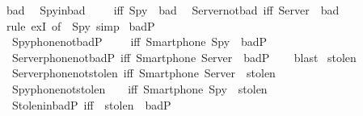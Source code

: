 \begin{isabellebody}
  \isanewline
  \isamarkupfalse%
  \ {\isacharparenleft}bad{\isacharparenright}\isanewline
  \ \ Spy{\isacharunderscore}in{\isacharunderscore}bad\ \ \ \ \ {\isacharbrackleft}iff{\isacharbrackright}{\isacharcolon}\ {\isachardoublequoteopen}Spy\ {\isasymin}\ bad{\isachardoublequoteclose}\isanewline
  \ \ Server{\isacharunderscore}not{\isacharunderscore}bad\ {\isacharbrackleft}iff{\isacharbrackright}{\isacharcolon}\ {\isachardoublequoteopen}Server\ {\isasymnotin}\ bad{\isachardoublequoteclose}\isanewline
  \isadelimproof
  \ \ %
  \endisadelimproof
  \isatagproof
  \isamarkupfalse%
  \ {\isacharparenleft}rule\ exI\ {\isacharbrackleft}of\ {\isacharunderscore}\ {\isachardoublequoteopen}{\isacharbraceleft}Spy{\isacharbraceright}{\isachardoublequoteclose}{\isacharbrackright}{\isacharcomma}\ simp{\isacharparenright}\isanewline
  \isamarkupfalse%
  \endisatagproof
  {\isafoldproof}%
  \isadelimproof
  \isanewline
  \endisadelimproof
  \isanewline
  \isamarkupfalse%
  \ {\isacharparenleft}badP{\isacharparenright}\isanewline
  \ \ \isanewline
  \ \ Spy{\isacharunderscore}phone{\isacharunderscore}not{\isacharunderscore}badP\ \ \ \ \ {\isacharbrackleft}iff{\isacharbrackright}{\isacharcolon}\ {\isachardoublequoteopen}Smartphone\ Spy\ {\isasymnotin}\ badP{\isachardoublequoteclose}\isanewline
  \ \ Server{\isacharunderscore}phone{\isacharunderscore}not{\isacharunderscore}badP\ {\isacharbrackleft}iff{\isacharbrackright}{\isacharcolon}\ {\isachardoublequoteopen}Smartphone\ Server\ {\isasymnotin}\ badP{\isachardoublequoteclose}\isanewline
  \isadelimproof
  \ \ %
  \endisadelimproof
  \isatagproof
  \isamarkupfalse%
  \ blast\isanewline
  \isamarkupfalse%
  \endisatagproof
  {\isafoldproof}%
  \isadelimproof
  \isanewline
  \endisadelimproof
  \isanewline
  \isamarkupfalse%
  \ {\isacharparenleft}stolen{\isacharparenright}\isanewline
  \ \ Server{\isacharunderscore}phone{\isacharunderscore}not{\isacharunderscore}stolen\ {\isacharbrackleft}iff{\isacharbrackright}{\isacharcolon}\ {\isachardoublequoteopen}Smartphone\ Server\ {\isasymnotin}\ stolen{\isachardoublequoteclose}\isanewline
  \ \ Spy{\isacharunderscore}phone{\isacharunderscore}not{\isacharunderscore}stolen\ \ \ \ {\isacharbrackleft}iff{\isacharbrackright}{\isacharcolon}\ {\isachardoublequoteopen}Smartphone\ Spy\ {\isasymnotin}\ stolen{\isachardoublequoteclose}\isanewline
  \ \ Stolen{\isacharunderscore}in{\isacharunderscore}badP\ {\isacharbrackleft}iff{\isacharbrackright}\ {\isacharcolon}\ {\isachardoublequoteopen}stolen\ {\isasymsubseteq}\ badP{\isachardoublequoteclose}\isanewline

\end{isabellebody}
